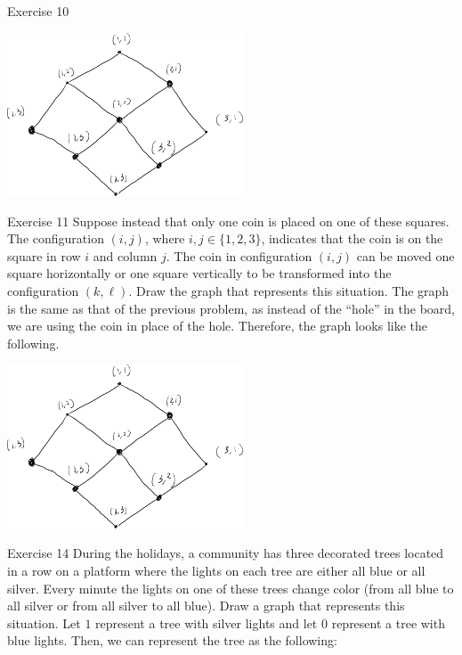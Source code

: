 \documentclass[12pt]{extarticle}
\begin{document}
{\begin{problem}{Exercise 10}
\begin{center}
    \end{center}
    \tcblower
    \begin{center}
      \includegraphics[width=7cm]{exercise_10_solution}
    \end{center}
  \end{problem}
  \begin{problem}{Exercise 11}
    Suppose instead that only one coin is placed on one of these squares. The configuration $(i,j)$, where $i,j\in \{1,2,3\}$, indicates that the coin is on the square in row $i$ and column $j$. The coin in configuration $(i,j)$ can be moved one square horizontally or one square vertically to be transformed into the configuration $(k,\ell)$. Draw the graph that represents this situation.
    \tcblower
    The graph is the same as that of the previous problem, as instead of the ``hole'' in the board, we are using the coin in place of the hole. Therefore, the graph looks like the following.
    \begin{center}
      \includegraphics[width=7cm]{exercise_10_solution}
    \end{center}
  \end{problem}
  \begin{problem}{Exercise 14}
    During the holidays, a community has three decorated trees located in a row on a platform where the lights on each tree are either all blue or all silver. Every minute the lights on one of these trees change color (from all blue to all silver or from all silver to all blue). Draw a graph that represents this situation.
    \tcblower
    Let $1$ represent a tree with silver lights and let $0$ represent a tree with blue lights. Then, we can represent the tree as the following:

\end{problem}}
\end{document}
